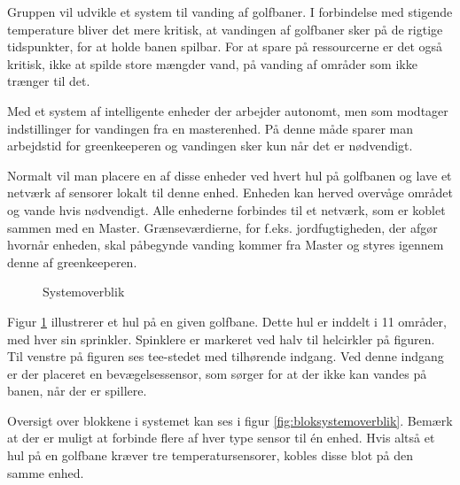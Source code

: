 Gruppen vil udvikle et system til vanding af golfbaner. I forbindelse med stigende temperature bliver det mere kritisk, at vandingen af golfbaner sker på de rigtige tidspunkter, for at holde banen spilbar. For at spare på ressourcerne er det også kritisk, ikke at spilde store mængder vand, på vanding af områder som ikke trænger til det.

Med et system af intelligente enheder der arbejder autonomt, men som modtager indstillinger for vandingen fra en masterenhed. På denne måde sparer man arbejdstid for greenkeeperen og vandingen sker kun når det er nødvendigt.

Normalt vil man placere en af disse enheder ved hvert hul på golfbanen og lave et netværk af sensorer lokalt til denne enhed. Enheden kan herved overvåge området og vande hvis nødvendigt. Alle enhederne forbindes til et netværk, som er koblet sammen med en Master. Grænseværdierne, for f.eks. jordfugtigheden, der afgør hvornår enheden, skal påbegynde vanding kommer fra Master og styres igennem denne af greenkeeperen. 

\begin{figure}[ht] \centering
{}
\caption{Systemoverblik}
\label{fig:systemoverblik}
\end{figure}

Figur \ref{fig:systemoverblik} illustrerer et hul på en given golfbane. Dette hul er inddelt i 11 områder, med hver sin sprinkler. Spinklere er markeret ved halv til helcirkler på figuren. Til venstre på figuren ses tee-stedet med tilhørende indgang. Ved denne indgang er der placeret en bevægelsessensor, som sørger for at der ikke kan vandes på banen, når der er spillere. 

Oversigt over blokkene i systemet kan ses i figur \ref{fig:bloksystemoverblik}.
Bemærk at der er muligt at forbinde flere af hver type sensor til én enhed. Hvis altså et hul på en golfbane kræver tre temperatursensorer, kobles disse blot på den samme enhed.

